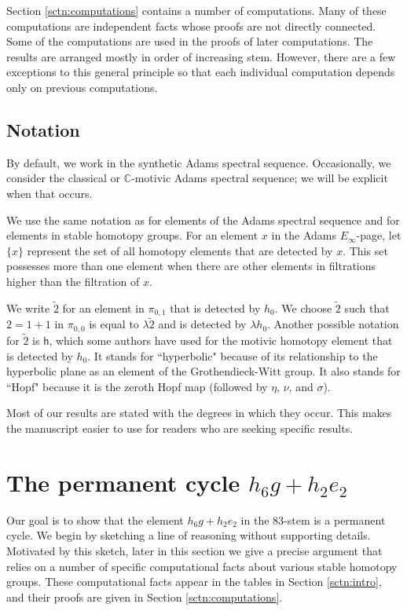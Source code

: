 \documentclass{amsart}
\theoremstyle{definition}
\newcommand{\C}{\mathbb{C}}
\newcommand{\hsf}{\widetilde{2}}
\begin{document}
Section \ref{sctn:computations} contains a number of computations.  Many of these computations are independent facts whose proofs are not directly connected.  Some of the computations are used in the proofs of later computations.  The results are arranged mostly in order of increasing stem.  However, there are a few exceptions to this general principle 
so that each individual computation depends only on previous computations.

\subsection{Notation}
\label{subsctn:notation}

By default, we work in the synthetic Adams spectral sequence.  Occasionally, we consider the classical or $\C$-motivic Adams spectral sequence; we will be explicit when that occurs.

We use the same notation as \cite{IWX} for elements of the Adams spectral sequence and for elements in stable homotopy groups.
For an element $x$ in the Adams $E_\infty$-page, let
$\{ x\}$ represent the set of all homotopy elements that are detected
by $x$.  This set possesses more than one element when there are
other elements in filtrations higher than the filtration of $x$.

We write $\hsf$ for an element in $\pi_{0,1}$ that 
is detected by $h_0$.  We choose $\hsf$ such that $2 = 1 + 1$
in $\pi_{0,0}$ is equal to $\lambda \hsf$ and is detected by $\lambda h_0$.
Another possible notation for $\hsf$ is $\mathsf{h}$, which 
some authors have used for the motivic homotopy element that is detected
by $h_0$.
It stands for ``hyperbolic" because of its relationship to the hyperbolic plane as an element of the Grothendieck-Witt group.  It also stands for ``Hopf" because it is the zeroth Hopf map (followed by $\eta$, $\nu$, and $\sigma$).

Most of our results are stated with the degrees in which they occur.  
This makes the manuscript
easier to use for readers who are seeking specific results.

\section{The permanent cycle $h_6 g + h_2 e_2$}
\label{sctn:h6g+h2e2}

Our goal is to show that the element $h_6 g + h_2 e_2$ 
in the $83$-stem is a permanent cycle.
We begin by sketching a line of reasoning without supporting details.
Motivated by this sketch,
later in this section we give
a precise argument that relies on a number of specific
computational facts about various stable homotopy groups.
These computational facts appear in the tables in 
Section \ref{sctn:intro}, and their proofs 
are given in Section \ref{sctn:computations}.
\end{document}
